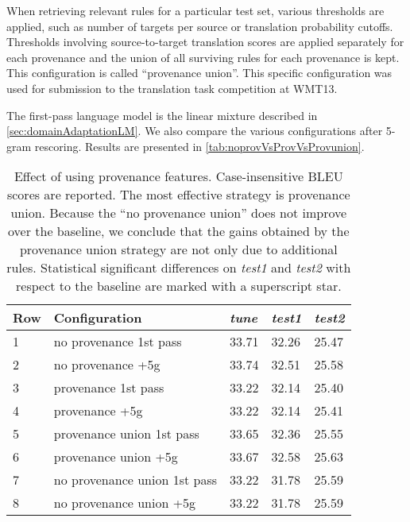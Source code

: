 When retrieving relevant rules for a particular test set, various thresholds are applied, such %
as number of targets per source or translation probability cutoffs.
Thresholds involving source-to-target translation scores are applied separately for each
provenance and the union of all surviving rules for each provenance is kept. This 
configuration is called ``provenance union''. This specific configuration
was used for submission to the translation task competition at WMT13.

The first-pass language model is the linear mixture described
in \autoref{sec:domainAdaptationLM}. We also compare
the various configurations after 5-gram rescoring.
Results are presented in \autoref{tab:noprovVsProvVsProvunion}.
%
\begin{table}
  \begin{center}
    \begin{tabular}{l|l|lll}
      Row & Configuration & \emph{tune} & \emph{test1} & \emph{test2} \\
      \hline
      1 & no provenance 1st pass & 33.71 & 32.26 & 25.47 \\
      2 & no provenance +5g           & 33.74 & 32.51 & 25.58 \\
      \hline
      3 & provenance 1st pass & 33.22 & 32.14 & 25.40 \\
      4 & provenance +5g        & 33.22 & 32.14 & 25.41 \\
      \hline
      5 & provenance union 1st pass & 33.65 & 32.36 & 25.55 \\
      6 & provenance union +5g              & 33.67 & 32.58 & 25.63 \\
      \hline
      7 & no provenance union 1st pass & 33.22 & 31.78 & 25.59 \\
      8 & no provenance union +5g      & 33.22 & 31.78 & 25.59 \\
    \end{tabular}
    \caption{Effect of using provenance features. Case-insensitive
      BLEU scores are reported. The most effective strategy is
      provenance union. Because the ``no provenance union'' does
      not improve over the baseline, we conclude that the gains
      obtained by the provenance union strategy are not only due
      to additional rules. Statistical significant differences on \emph{test1}
      and \emph{test2} with respect to the baseline are marked
      with a superscript star.}
    \label{tab:noprovVsProvVsProvunion}
  \end{center}
\end{table}
